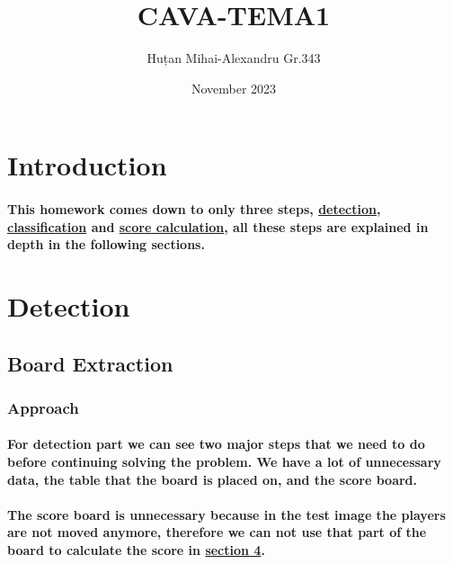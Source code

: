 \documentclass[12pt]{article}
\title{CAVA-TEMA1}
\author{Huțan Mihai-Alexandru Gr.343}
\date{November 2023}
\begin{document}
    \maketitle


    \tableofcontents


    \section{Introduction}\label{sec:introduction}

    \paragraph{This homework comes down to only three steps, \hyperref[sec:detection]{detection}, \hyperref[sec:classification]{classification} and \hyperref[sec:score-calculation]{score calculation}, all these steps are explained in depth in the following sections.}


    \section{Detection}\label{sec:detection}

    \subsection{Board Extraction}\label{subsec:board-extraction}

    \subsubsection{Approach}

    \paragraph{For detection part we can see two major steps that we need to do before continuing solving the problem. We have a lot of unnecessary data, the table that the board is placed on, and the score board.}

    \paragraph{The score board is unnecessary because in the test image the players are not moved anymore, therefore we can not use that part of the board to calculate the score in \hyperref[sec:score-calculation]{section 4}.}
\end{document}
